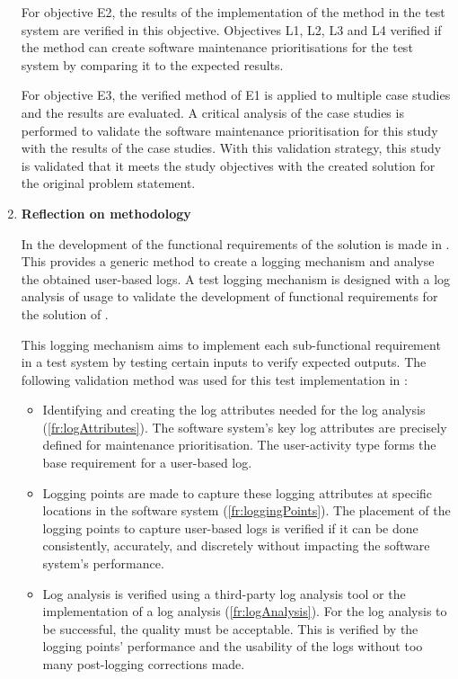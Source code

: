 \begin{enumerate}[label=\textbf{\Roman*.}]
		For objective E2, the results of the implementation of the method in the test system are verified in this objective. Objectives L1, L2, L3 and L4 verified if the method can create software maintenance prioritisations for the test system by comparing it to the expected results. \par For objective E3, the verified method of E1 is applied to multiple case studies and the results are evaluated. A critical analysis of the case studies is performed to validate the software maintenance prioritisation for this study with the results of the case studies. With this validation strategy, this study is validated that it meets the study objectives with the created solution for the original problem statement.

\item \textbf{Reflection on methodology} \par In  the development of the functional requirements of the solution is made in . This provides a generic method to create a logging mechanism and analyse the obtained user-based logs. A test logging mechanism is designed with a log analysis of usage to validate the development of functional requirements for the solution of .\par This logging mechanism aims to implement each sub-functional requirement in a test system by testing certain inputs to verify expected outputs. The following validation method was used for this test implementation in :
	\begin{itemize}
		\item Identifying and creating the log attributes needed for the log analysis (\ref{fr:logAttributes}). The software system's key log attributes are precisely defined for maintenance prioritisation. The user-activity type forms the base requirement for a user-based log.
		
		\item Logging points are made to capture these logging attributes at specific locations in the software system (\ref{fr:loggingPoints}). The placement of the logging points to capture user-based logs is verified if it can be done consistently, accurately, and discretely without impacting the software system's performance. 
		
		\item Log analysis is verified using a third-party log analysis tool or the implementation of a log analysis (\ref{fr:logAnalysis}). For the log analysis to be successful, the quality must be acceptable. This is verified by the logging points' performance and the usability of the logs without too many post-logging corrections made.
		

\end{itemize}
\end{enumerate}
